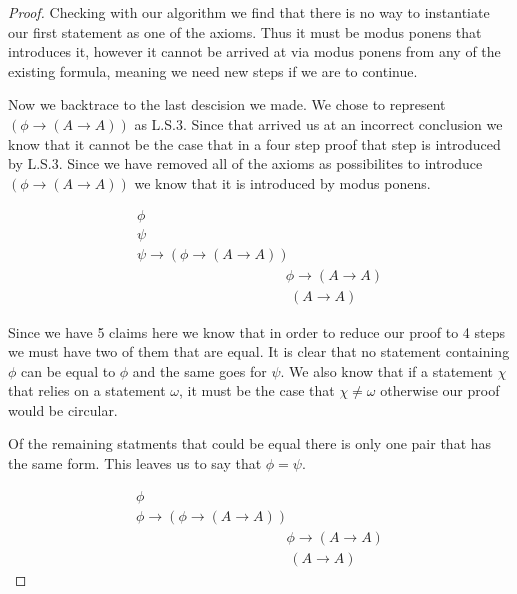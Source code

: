 \documentclass{article}
\begin{document}
\begin{proof}
Checking with our algorithm we find that there is no way to instantiate our first statement as one of the axioms.
Thus it must be modus ponens that introduces it, however it cannot be arrived at via modus ponens from any of the existing formula, meaning we need new steps if we are to continue.

Now we backtrace to the last descision we made.
We chose to represent $(\phi \rightarrow (A \rightarrow A))$ as L.S.3.
Since that arrived us at an incorrect conclusion we know that it cannot be the case that in a four step proof that step is introduced by L.S.3.
Since we have removed all of the axioms as possibilites to introduce $(\phi \rightarrow (A \rightarrow A))$ we know that it is introduced by modus ponens.

\begin{gather*}
\phi \tag{$\gamma$}\\
\psi \tag{$\epsilon$}\\
\psi \rightarrow (\phi \rightarrow (A \rightarrow A)) \tag{$\delta$}\\
\phantom{\text{Modus Ponens ($\epsilon$, $\delta$) ($\beta$)}} \phi \rightarrow (A \rightarrow A) \tag*{Modus Ponens ($\epsilon$, $\delta$) ($\beta$)} \\
\phantom{\text{Modus Ponens ($\gamma$, $\beta$) ($\alpha$)}} (A \rightarrow A) \tag*{Modus Ponens ($\gamma$, $\beta$) ($\alpha$)}
\end{gather*}

Since we have 5 claims here we know that in order to reduce our proof to 4 steps we must have two of them that are equal.
It is clear that no statement containing $\phi$ can be equal to $\phi$ and the same goes for $\psi$.
We also know that if a statement $\chi$ that relies on a statement $\omega$, it must be the case that $\chi \neq \omega$ otherwise our proof would be circular.

Of the remaining statments that could be equal there is only one pair that has the same form.
This leaves us to say that $\phi = \psi$. 

\begin{gather*}
\phi \tag{$\gamma$}\\
\phi \rightarrow (\phi \rightarrow (A \rightarrow A)) \tag{$\delta$}\\
\phantom{\text{Modus Ponens ($\gamma$, $\delta$) ($\beta$)}} \phi \rightarrow (A \rightarrow A) \tag*{Modus Ponens ($\gamma$, $\delta$) ($\beta$)} \\
\phantom{\text{Modus Ponens ($\gamma$, $\beta$) ($\alpha$)}} (A \rightarrow A) \tag*{Modus Ponens ($\gamma$, $\beta$) ($\alpha$)}
\end{gather*}


\end{proof}
\end{document}
